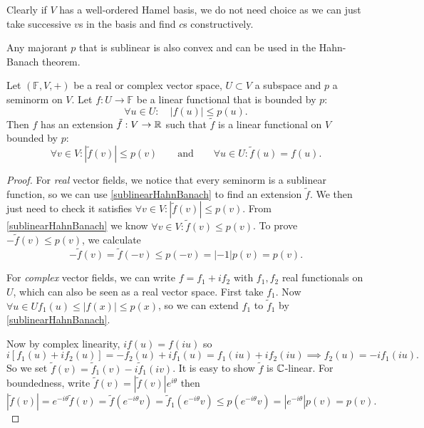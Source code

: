 Clearly if $V$ has a well-ordered Hamel basis, we do not need choice as we can just take successive $v$s in the basis and find $c$s constructively.
\begin{corollary} \label{sublinearHahnBanach}
Any majorant $p$ that is sublinear is also convex and can be used in the Hahn-Banach theorem.
\end{corollary}
\begin{corollary} \label{seminormHahnBanach}
Let $(\mathbb{F},V,+)$ be a real or complex vector space, $U\subset V$ a subspace and $p$ a seminorm on $V$. Let $f:U\to\mathbb{F}$ be a linear functional that is bounded by $p$:
\[ \forall u\in U: \quad |f(u)| \leq p(u). \]
Then $f$ has an extension $\tilde{f}: V\to \mathbb{R}$ such that $\tilde{f}$ is a linear functional on $V$ bounded by $p$:
\[ \forall v\in V: |\tilde{f}(v)| \leq p(v) \qquad \text{and} \qquad \forall u\in U: \tilde{f}(u) = f(u). \]
\end{corollary}
\begin{proof}
For \emph{real} vector fields, we notice that every seminorm is a sublinear function, so we can use \ref{sublinearHahnBanach} to find an extension $\tilde{f}$. We then just need to check it satisfies $\forall v\in V: |\tilde{f}(v)| \leq p(v)$.
From \ref{sublinearHahnBanach} we know $\forall v\in V: \tilde{f}(v) \leq p(v)$.
To prove $-\tilde{f}(v) \leq p(v)$, we calculate
\[ -\tilde{f}(v) = \tilde{f}(-v) \leq p(-v) = |-1|p(v) = p(v). \]

For \emph{complex} vector fields, we can write $f= f_1 + if_2$ with $f_1,f_2$ real functionals on $U$, which can also be seen as a real vector space. First take $f_1$. Now $\forall u\in U f_1(u) \leq |f(x)| \leq p(x)$, so we can extend $f_1$ to $\tilde{f}_1$ by \ref{sublinearHahnBanach}.

Now by complex linearity, $if(u) = f(iu)$ so
\[ i[f_1(u) + if_2(u)] = -f_2(u) + if_1(u) = f_1(iu) + if_2(iu) \implies f_2(u) = -if_1(iu). \]
So we set $\tilde{f}(v) = \tilde{f}_1(v)-i\tilde{f}_1(iv)$. It is easy to show $\tilde{f}$ is $\mathbb{C}$-linear. For boundedness, write $\tilde{f}(v) = |\tilde{f}(v)|e^{i\theta}$ then
\[ |\tilde{f}(v)| = e^{-i\theta}\tilde{f}(v) = \tilde{f}(e^{-i\theta}v) = \tilde{f}_1(e^{-i\theta}v) \leq p(e^{-i\theta}v) = |e^{-i\theta}|p(v) = p(v). \]
\end{proof}

